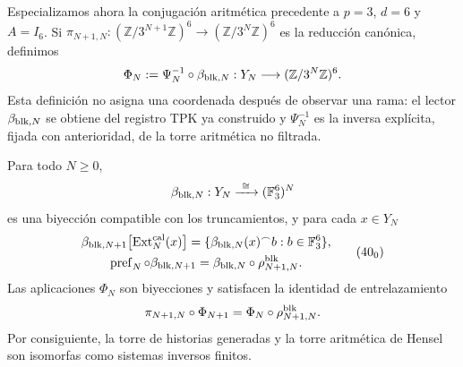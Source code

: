 Especializamos ahora la conjugación aritmética precedente a
\(p=3\), \(d=6\) y \(A=I_6\). Si
\(\pi_{N+1,N}:(\mathbb Z/3^{N+1}\mathbb Z)^6\to
(\mathbb Z/3^N\mathbb Z)^6\) es la reducción canónica, definimos
\begin{equation}
 \Phi_N:=\Psi_N^{-1}\circ\beta_{{\rm blk},N}:
 Y_N\longrightarrow(\mathbb Z/3^N\mathbb Z)^6.
 \label{ix:eq:phi-hensel-bloques-ch}
\end{equation}
Esta definición no asigna una coordenada después de observar una rama: el
lector \(\beta_{{\rm blk},N}\) se obtiene del registro TPK ya construido y
\(\Psi_N^{-1}\) es la inversa explícita, fijada con anterioridad, de la torre
aritmética no filtrada.

\begin{proposition}
\label{ix:prop:cobertura-729-seccion}
Para todo \(N\geq0\),
\[
 \beta_{{\rm blk},N}:Y_N\xrightarrow{\ \cong\ }
 (\mathbb F_3^6)^N
\]
es una biyección compatible con los truncamientos, y para cada \(x\in Y_N\)
\[
 \begin{gathered}
 \beta_{{\rm blk},N+1}
 \bigl[\operatorname{Ext}^{\rm cal}_N(x)\bigr]
 =\{\beta_{{\rm blk},N}(x)^\frown b:
       b\in\mathbb F_3^6\},\\
 \operatorname{pref}_N\circ\beta_{{\rm blk},N+1}
 =\beta_{{\rm blk},N}\circ\rho^{\rm blk}_{N+1,N}.
 \end{gathered}
\tag{40$_0$}
\label{ix:eq:cobertura-729-ch}
\]
Las aplicaciones \(\Phi_N\) son biyecciones y satisfacen la identidad de
entrelazamiento
\begin{equation}
 \pi_{N+1,N}\circ\Phi_{N+1}
 =\Phi_N\circ\rho^{\rm blk}_{N+1,N}.
 \label{ix:eq:entrelazamiento-hensel-ext-ch}
\end{equation}
Por consiguiente, la torre de historias generadas y la torre aritmética de
Hensel son isomorfas como sistemas inversos finitos.
\end{proposition}

